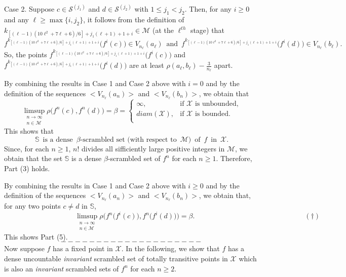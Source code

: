 \documentclass[12pt]{article}
\begin{document}
Case 2. Suppose $c \in \mathcal S^{(j_1)}$ and $d \in \mathcal S^{(j_2)}$ with $1 \le j_1 < j_2$.  Then, for any $i \ge 0$ and any $\ell \ge \max \{ i, j_2 \}$, it follows from the definition of $k_{[(\ell-1)(10\ell^2+7\ell+6)/6]+j_1(\ell+1)+1+i} \in \mathcal M$ (at the $\ell^{th}$ stage) that 
$$
f^{k_{[(\ell-1)(10\ell^2+7\ell+6)/6]+j_1(\ell+1)+1+i}}\big(f^i(c)\big) \in V_{n_\ell}(a_\ell) \,\,\, \text{and} \,\,\, f^{k_{[(\ell-1)(10\ell^2+7\ell+6)/6]+j_1(\ell+1)+1+i}}\big(f^i(d)\big) \in V_{n_\ell}(b_\ell).
$$
So, the points $f^{k_{[(\ell-1)(10\ell^2+7\ell+6)/6]+j_1(\ell+1)+1+i}}\big(f^i(c)\big)$ and $f^{k_{[(\ell-1)(10\ell^2+7\ell+6)/6]+j_1(\ell+1)+1+i}}\big(f^i(d)\big)$ are at least $\rho(a_\ell, b_\ell) - \frac 3{n_\ell}$ apart.  

By combining the results in Case 1 and Case 2 above with $i = 0$ and by the definition of the sequences $<V_{n_\ell}(a_n)>$ and $<V_{n_\ell}(b_n)>$, we obtain that 
$$
\limsup_{\substack{n \to \infty \\ n \in \mathcal M}} \rho\big(f^n(c), f^n(d)\big) = \beta = \begin{cases}
                       \infty, & \text{if $\mathcal X$ is unbounded,} \\
                       diam(\mathcal X), & \text{if $\mathcal X$ is bounded.} \\
                       \end{cases}
$$
This shows that 
$$
\mathbb S \,\,\, \text{is a dense} \,\,\, \beta\text{-scrambled set (with respect to} \,\,\, \mathcal M) \,\,\, \text{of} \,\,\, f \,\,\, \text{in} \,\,\, \mathcal X.
$$
\indent Since, for each $n \ge 1$, $n !$ divides all sifficiently large positive integers in $\mathcal M$, we obtain that the set $\mathbb S$ is a dense $\beta$-scrambled set of $f^n$ for each $n \ge 1$.  Therefore, Part (3) holds.

By combining the results in Case 1 and Case 2 above with $i \ge 0$ and by the definition of the sequences $<V_{n_\ell}(a_n)>$ and $<V_{n_\ell}(b_n)>$, we obtain that, for any two points $c \ne d$ in $\mathbb S$,  
$$   
\qquad\qquad\qquad\qquad\qquad \limsup_{\substack{n \to \infty \\ n \in \mathcal M}} \rho\bigg(f^n\big(f^i(c)\big), f^n\big(f^i(d)\big)\bigg) = \beta. \qquad\qquad\qquad\qquad\qquad\qquad\qquad\quad\,\,\, (\dagger)
$$   
This shows Part (5).
$$--------------------$$
\indent Now suppose $f$ has a fixed point in $\mathcal X$.  In the following, we show that $f$ has a dense uncountable {\it invariant} scrambled set of totally transitive points in $\mathcal X$ which is also an {\it invariant} scrambled sets of $f^n$ for each $n \ge 2$.
\end{document}
